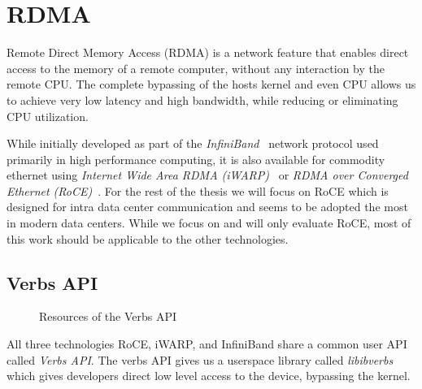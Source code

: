 \section{RDMA}


Remote Direct Memory Access (RDMA) is a network feature that enables direct access to the memory of a remote computer, 
without any interaction by the remote CPU. The complete bypassing of the hosts kernel and even CPU allows us to achieve 
very low latency and high bandwidth, while reducing or eliminating CPU utilization.

While initially developed as part of the \emph{InfiniBand}~\cite{} network protocol used primarily in high performance computing,
it is also available for commodity ethernet using \emph{Internet Wide Area RDMA (iWARP)}~\cite{} or
\emph{RDMA over Converged Ethernet (RoCE)}~\cite{}. For the rest of the thesis we will focus on RoCE which is designed for 
intra data center communication and seems to be adopted the most in modern data centers. 
While we focus on and will only evaluate RoCE, most of this work should be applicable to the other technologies.



\subsection{Verbs API}
\begin{figure}[!ht]
\begin{center}
\end{center}
\caption{Resources of the Verbs API}
\label{fig:rdma-parts}
\end{figure}


All three technologies RoCE, iWARP, and InfiniBand share a common user API called \emph{Verbs API}. The verbs API gives us a
userspace library called \emph{libibverbs} which gives developers direct low level access to the device, bypassing the kernel.

